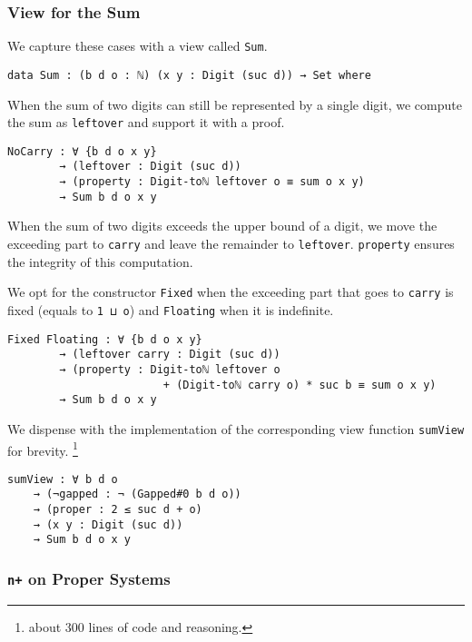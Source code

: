 \documentclass[\main/thesis.tex]{subfiles}
\begin{document}
\subsubsection{View for the Sum}

We capture these cases with a view called \lstinline|Sum|.

\begin{lstlisting}[basicstyle=\ttfamily\scriptsize]
data Sum : (b d o : ℕ) (x y : Digit (suc d)) → Set where
\end{lstlisting}

When the sum of two digits can still be represented by a single digit,
we compute the sum as \lstinline|leftover| and support it with a proof.

\begin{lstlisting}[basicstyle=\ttfamily\scriptsize]
    NoCarry : ∀ {b d o x y}
        → (leftover : Digit (suc d))
        → (property : Digit-toℕ leftover o ≡ sum o x y)
        → Sum b d o x y
\end{lstlisting}

When the sum of two digits exceeds the upper bound of a digit,
we move the exceeding part to \lstinline|carry| and leave the remainder to
\lstinline|leftover|. \lstinline|property| ensures the integrity of this
computation.

We opt for the constructor \lstinline|Fixed| when the exceeding part that goes
to \lstinline|carry| is fixed (equals to \lstinline|1 ⊔ o|) and
\lstinline|Floating| when it is indefinite.

\begin{lstlisting}[basicstyle=\ttfamily\scriptsize]
    Fixed Floating : ∀ {b d o x y}
        → (leftover carry : Digit (suc d))
        → (property : Digit-toℕ leftover o
                        + (Digit-toℕ carry o) * suc b ≡ sum o x y)
        → Sum b d o x y
\end{lstlisting}

We dispense with the implementation of the corresponding view function
\lstinline|sumView| for brevity.
\footnote{about 300 lines of code and reasoning.}

\begin{lstlisting}
sumView : ∀ b d o
    → (¬gapped : ¬ (Gapped#0 b d o))
    → (proper : 2 ≤ suc d + o)
    → (x y : Digit (suc d))
    → Sum b d o x y
\end{lstlisting}

\subsubsection{\lstinline|n+| on Proper Systems}
\end{document}
